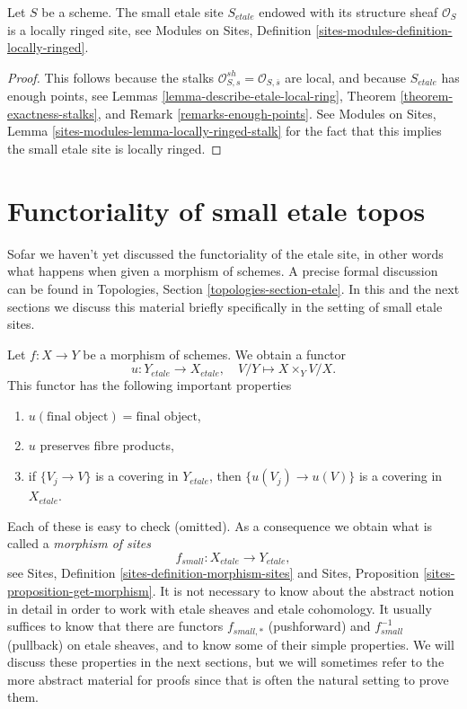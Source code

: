 \begin{lemma}
\label{lemma-etale-site-locally-ringed}
Let $S$ be a scheme. The small etale site $S_{etale}$ endowed with its
structure sheaf $\mathcal{O}_S$ is a locally ringed site, see
Modules on Sites, Definition \ref{sites-modules-definition-locally-ringed}.
\end{lemma}

\begin{proof}
This follows because the stalks
$\mathcal{O}_{S, s}^{sh} = \mathcal{O}_{S, \overline{s}}$ are
local, and because $S_{etale}$ has enough points, see
Lemmas \ref{lemma-describe-etale-local-ring},
Theorem \ref{theorem-exactness-stalks}, and
Remark \ref{remarks-enough-points}.
See
Modules on Sites, Lemma \ref{sites-modules-lemma-locally-ringed-stalk}
for the fact that this implies the small etale site is locally ringed.
\end{proof}






\section{Functoriality of small etale topos}
\label{section-functoriality}

\noindent
Sofar we haven't yet discussed the functoriality of the etale site, in
other words what happens when given a morphism of schemes. A precise formal
discussion can be found in
Topologies, Section \ref{topologies-section-etale}.
In this and the next sections we discuss this material briefly specifically
in the setting of small etale sites.

\medskip\noindent
Let $f : X \to Y$ be a morphism of schemes. We obtain a functor
\begin{equation}
\label{equation-functorial}
u : Y_{etale} \longrightarrow X_{etale},\quad
V/Y \longmapsto X \times_Y V/X.
\end{equation}
This functor has the following important properties
\begin{enumerate}
\item $u(\text{final object}) = \text{final object}$,
\item $u$ preserves fibre products,
\item if $\{V_j \to V\}$ is a covering in $Y_{etale}$, then
$\{u(V_j) \to u(V)\}$ is a covering in $X_{etale}$.
\end{enumerate}
Each of these is easy to check (omitted). As a consequence we obtain what
is called a {\it morphism of sites}
$$
f_{small} : X_{etale} \longrightarrow Y_{etale},
$$
see
Sites, Definition \ref{sites-definition-morphism-sites}
and
Sites, Proposition \ref{sites-proposition-get-morphism}.
It is not necessary to know about the abstract notion in detail
in order to work with etale sheaves and etale cohomology.
It usually suffices to know that there are functors
$f_{small, *}$ (pushforward) and $f_{small}^{-1}$ (pullback)
on etale sheaves, and to know some of their simple properties.
We will discuss these properties in the next sections, but we will
sometimes refer to the more abstract material for proofs since
that is often the natural setting to prove them.


